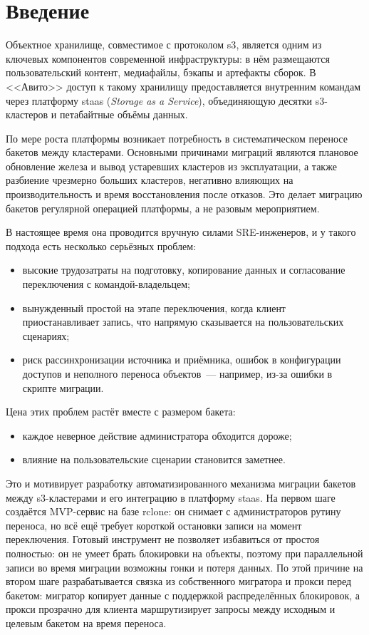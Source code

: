 \section*{Введение}

Объектное хранилище, совместимое с протоколом \gls{s3}, является одним из ключевых компонентов современной инфраструктуры: в нём размещаются пользовательский контент, медиафайлы, бэкапы и артефакты сборок.
В <<Авито>> доступ к такому хранилищу предоставляется внутренним командам через платформу \gls{staas} (\textit{Storage as a Service}), объединяющую десятки \gls{s3}-кластеров и петабайтные объёмы данных.

По мере роста платформы возникает потребность в систематическом переносе бакетов между кластерами.
Основными причинами миграций являются плановое обновление железа и вывод устаревших кластеров из эксплуатации, а также разбиение чрезмерно больших кластеров, негативно влияющих на производительность и время восстановления после отказов.
Это делает миграцию бакетов регулярной операцией платформы, а не разовым мероприятием.

В настоящее время она проводится вручную силами SRE-инженеров, и у такого подхода есть несколько серьёзных проблем:
\begin{itemize}
    \item высокие трудозатраты на подготовку, копирование данных и согласование переключения с командой-владельцем;
    \item вынужденный простой на этапе переключения, когда клиент приостанавливает запись, что напрямую сказывается на пользовательских сценариях;
    \item риск рассинхронизации источника и приёмника, ошибок в конфигурации доступов и неполного переноса объектов~--- например, из-за ошибки в скрипте миграции.
\end{itemize}
Цена этих проблем растёт вместе с размером бакета:
\begin{itemize}
    \item каждое неверное действие администратора обходится дороже;
    \item влияние на пользовательские сценарии становится заметнее.
\end{itemize}

Это и мотивирует разработку автоматизированного механизма миграции бакетов между \gls{s3}-кластерами и его интеграцию в платформу \gls{staas}.
На первом шаге создаётся MVP-сервис на базе \gls{rclone}: он снимает с администраторов рутину переноса, но всё ещё требует короткой остановки записи на момент переключения.
Готовый инструмент не позволяет избавиться от простоя полностью: он не умеет брать блокировки на объекты, поэтому при параллельной записи во время миграции возможны гонки и потеря данных.
По этой причине на втором шаге разрабатывается связка из собственного мигратора и прокси перед бакетом: мигратор копирует данные с поддержкой распределённых блокировок, а прокси прозрачно для клиента маршрутизирует запросы между исходным и целевым бакетом на время переноса.
